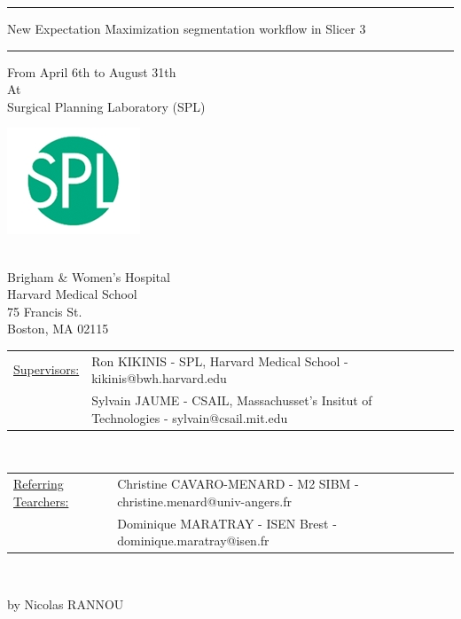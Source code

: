 \documentclass[a4paper,11pt]{report}
\begin{document}
\begin{titlepage}
\begin{center}
\bigskip
\bigskip
\bigskip

\hrule
\bigskip
\begin{minipage}{1\textwidth}
\begin{center}\begin{LARGE} 
New Expectation Maximization segmentation workflow in Slicer 3
\end{LARGE}\end{center}
\end{minipage}
\bigskip
\hrule

\bigskip
\bigskip
\bigskip

\begin{small}From April 6th to August 31th \\ 
At \\ 
Surgical Planning Laboratory (SPL)
\end{small}

\includegraphics[width=.3\textwidth]{Images/Logos/logo_spl.jpg}
\begin{small}\\Brigham \& Women's Hospital\\
 Harvard Medical School \\
 75 Francis St. \\
 Boston, MA 02115\end{small}
\end{center}
\vspace{0.5cm}
\begin{tabular}{*{2}ll}
\underline{Supervisors:} &Ron KIKINIS - SPL, Harvard Medical School - kikinis@bwh.harvard.edu\\
&Sylvain JAUME - CSAIL, Massachusset's Insitut of Technologies - sylvain@csail.mit.edu\\
\end{tabular}
\vspace{0.5cm}\\
\begin{tabular}{*{2}l}
\underline{Referring Tearchers:} &Christine CAVARO-MENARD - M2 SIBM - christine.menard@univ-angers.fr\\
&Dominique MARATRAY - ISEN Brest - dominique.maratray@isen.fr
\end{tabular}
\vspace{0.5cm}\\
\begin{flushright}by Nicolas RANNOU\end{flushright}

\end{titlepage}
\end{document}
